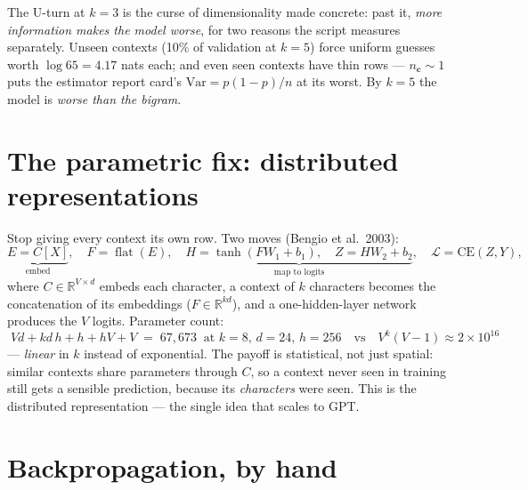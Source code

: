 \documentclass[11pt]{article}
\begin{document}
The U-turn at $k=3$ is the curse of dimensionality made concrete: past
it, \emph{more information makes the model worse}, for two reasons the
script measures separately. Unseen contexts (10\% of validation at
$k=5$) force uniform guesses worth $\log 65 = 4.17$ nats each; and even
seen contexts have thin rows --- $n_{\mathbf{c}} \sim 1$ puts the
estimator report card's $\mathrm{Var} = p(1-p)/n$ at its worst. By
$k=5$ the model is \emph{worse than the bigram}.

\section{The parametric fix: distributed representations}

Stop giving every context its own row. Two moves (Bengio et al.\ 2003):
\begin{equation}
  \underbrace{E = C[X]}_{\text{embed}}, \quad
  F = \operatorname{flat}(E), \quad
  \underbrace{H = \tanh(F W_1 + b_1), \quad
  Z = H W_2 + b_2}_{\text{map to logits}}, \quad
  \mathcal{L} = \mathrm{CE}(Z, Y),
  \label{eq:mlp}
\end{equation}
where $C \in \mathbb{R}^{V \times d}$ embeds each character, a context
of $k$ characters becomes the concatenation of its embeddings
($F \in \mathbb{R}^{kd}$), and a one-hidden-layer network produces the
$V$ logits. Parameter count:
\begin{equation}
  \boxed{\;Vd + kd\,h + h + hV + V
  \;=\; 67{,}673 \ \text{ at } k{=}8,\, d{=}24,\, h{=}256
  \quad\text{vs}\quad V^k(V{-}1) \approx 2\times10^{16}\;}
  \label{eq:params}
\end{equation}
--- \emph{linear} in $k$ instead of exponential. The payoff is
statistical, not just spatial: similar contexts share parameters
through $C$, so a context never seen in training still gets a sensible
prediction, because its \emph{characters} were seen. This is the
distributed representation --- the single idea that scales to GPT.

\section{Backpropagation, by hand}
\end{document}
